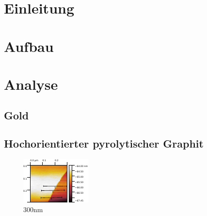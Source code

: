 \tableofcontents
\newpage
\listoffigures

\listoftables

\skippage

\setcounter{page}{1}
\restoregeometry
\thispagestyle{fancy}


\section{Einleitung}


\section{Aufbau}


\section{Analyse}
\subsection{Gold}

\subsection{Hochorientierter pyrolytischer Graphit}

\begin{figure}[H]
\centering
\includegraphics[width=\textwidth]{../Gwyddion/HOPG/300nm.pdf}
\caption{300nm}
\label{300nm}
\end{figure}	

